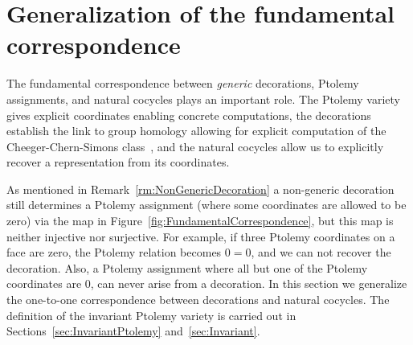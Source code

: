 \documentclass[11pt]{amsart}
\theoremstyle{plain}
\theoremstyle{definition}
\numberwithin{equation}{section}
\begin{document}
\section{Generalization of the fundamental correspondence}
The fundamental correspondence between \emph{generic} decorations, Ptolemy assignments, and natural cocycles plays an important role. The Ptolemy variety gives explicit coordinates enabling concrete computations, the decorations establish the link to group homology allowing for explicit computation of the Cheeger-Chern-Simons class~\cite{GaroufalidisThurstonZickert}, and the natural cocycles allow us to explicitly recover a representation from its coordinates.

As mentioned in Remark~\ref{rm:NonGenericDecoration} a non-generic decoration still determines a Ptolemy assignment (where some coordinates are allowed to be zero) via the map in Figure~\ref{fig:FundamentalCorrespondence}, but this map is neither injective nor surjective. For example, if three Ptolemy coordinates on a face are zero, the Ptolemy relation becomes $0=0$, and we can not recover the decoration. Also, a Ptolemy assignment where all but one of the Ptolemy coordinates are 0, can never arise from a decoration. 
In this section we generalize the one-to-one correspondence between decorations and natural cocycles. The definition of the invariant Ptolemy variety is carried out in Sections~\ref{sec:InvariantPtolemy} and~\ref{sec:Invariant}.




\end{document}
